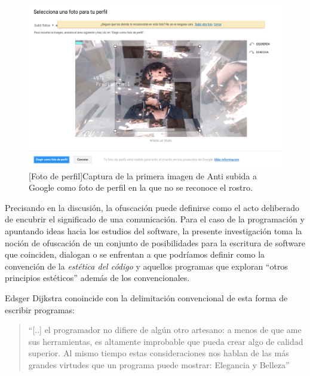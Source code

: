 \vspace*{\fill}
\begin{figure}
\includegraphics[width=\columnwidth]{../img/felicidades.png}
[Foto de perfil]{Captura de la primera imagen de Anti subida a Google como foto de perfil en la que no se reconoce el rostro.} %
\label{fig:gallery} 
\end{figure}
  
Precisando en la discusión, la ofuscación puede definirse como el acto deliberado de encubrir el significado de una comunicación. Para el caso de la programación y apuntando ideas hacia los estudios del software, la presente investigación toma la noción de ofuscación de un conjunto de posibilidades para la escritura de software que coinciden, dialogan o se enfrentan a que podríamos definir como la convención de la \emph{estética del código} y aquellos programas que exploran ``otros principios estéticos'' además de los convencionales.

Edsger Dijkstra conoincide con la delimitación convencional de esta forma de escribir programas:

\begin{quote}
``[..] el programador no difiere de algún otro artesano: a menos de que ame sus herramientas, es altamente improbable que pueda crear algo de calidad superior. Al mismo tiempo estas consideraciones nos hablan de las más grandes virtudes que un programa puede mostrar: Elegancia y Belleza''\citep[p.~10]{EWD:EWD35}
\end{quote}

